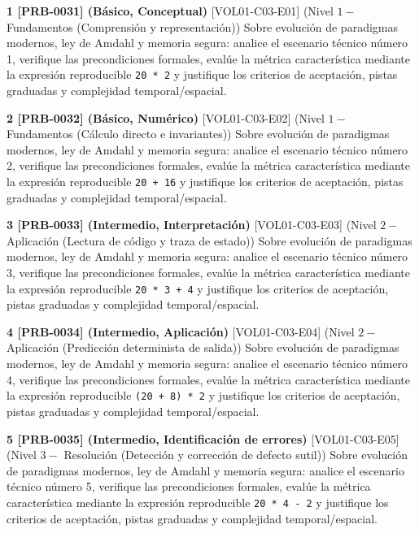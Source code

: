 \documentclass{book}
\begin{document}
\begin{tcolorbox}[title={Ejercicios}, studiumworked, breakable]

\noindent\textbf{1 [PRB-0031] (Básico, Conceptual)}
[VOL01-C03-E01] (Nivel \(1 -\) Fundamentos (Comprensión y representación)) Sobre evolución de paradigmas modernos, ley de Amdahl y memoria segura: analice el escenario técnico número 1, verifique las precondiciones formales, evalúe la métrica característica mediante la expresión reproducible \texttt{20 * 2} y justifique los criterios de aceptación, pistas graduadas y complejidad temporal/espacial.

\noindent\textbf{2 [PRB-0032] (Básico, Numérico)}
[VOL01-C03-E02] (Nivel \(1 -\) Fundamentos (Cálculo directo e invariantes)) Sobre evolución de paradigmas modernos, ley de Amdahl y memoria segura: analice el escenario técnico número 2, verifique las precondiciones formales, evalúe la métrica característica mediante la expresión reproducible \texttt{20 + 16} y justifique los criterios de aceptación, pistas graduadas y complejidad temporal/espacial.

\noindent\textbf{3 [PRB-0033] (Intermedio, Interpretación)}
[VOL01-C03-E03] (Nivel \(2 -\) Aplicación (Lectura de código y traza de estado)) Sobre evolución de paradigmas modernos, ley de Amdahl y memoria segura: analice el escenario técnico número 3, verifique las precondiciones formales, evalúe la métrica característica mediante la expresión reproducible \texttt{20 * 3 + 4} y justifique los criterios de aceptación, pistas graduadas y complejidad temporal/espacial.

\noindent\textbf{4 [PRB-0034] (Intermedio, Aplicación)}
[VOL01-C03-E04] (Nivel \(2 -\) Aplicación (Predicción determinista de salida)) Sobre evolución de paradigmas modernos, ley de Amdahl y memoria segura: analice el escenario técnico número 4, verifique las precondiciones formales, evalúe la métrica característica mediante la expresión reproducible \texttt{(20 + 8) * 2} y justifique los criterios de aceptación, pistas graduadas y complejidad temporal/espacial.

\noindent\textbf{5 [PRB-0035] (Intermedio, Identificación de errores)}
[VOL01-C03-E05] (Nivel \(3 -\) Resolución (Detección y corrección de defecto sutil)) Sobre evolución de paradigmas modernos, ley de Amdahl y memoria segura: analice el escenario técnico número 5, verifique las precondiciones formales, evalúe la métrica característica mediante la expresión reproducible \texttt{20 * 4 - 2} y justifique los criterios de aceptación, pistas graduadas y complejidad temporal/espacial.


\end{tcolorbox}
\end{document}
